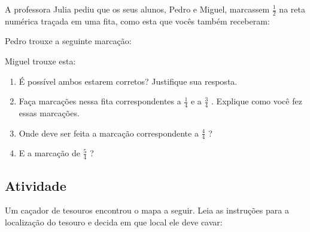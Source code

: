 \documentclass[a4,12pt]{book}
\begin{document}
A professora Julia pediu que os seus alunos, Pedro e Miguel, marcassem $\frac{1}{2}$ na reta numérica traçada em uma fita, como esta que vocês também receberam:

\begin{center}
\end{center}

Pedro trouxe a seguinte marcação: 

Miguel trouxe esta:

\begin{enumerate} [\quad a)] %
  \item     É possível ambos estarem corretos? Justifique sua resposta. 
  \item     Faça marcações nessa fita correspondentes a     $\frac{1}{4}$     e a     $\frac{3}{4}$    . Explique como você fez essas marcações.
  \item     Onde deve ser feita a marcação correspondente a     $\frac{4}{4}$    ?
  \item     E a marcação de     $\frac{5}{4}$    ? 
\end{enumerate} %

\subsection{Atividade}

Um caçador de tesouros encontrou o mapa a seguir. Leia as instruções para a localização do tesouro e decida em que local ele deve cavar:
\end{document}
